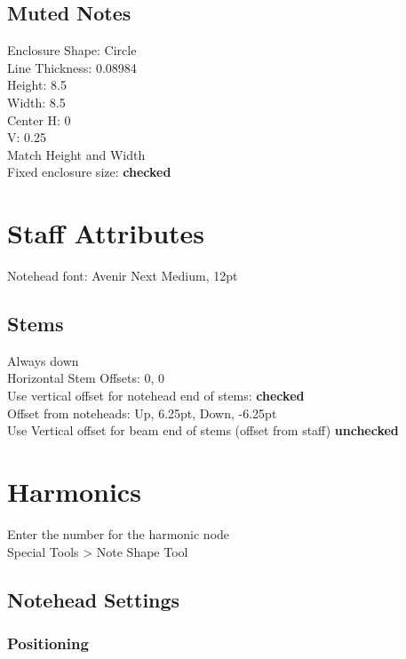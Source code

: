 \documentclass[10pt,twoside]{article} %
\begin{document}
\subsection{Muted Notes}
\label{sec:muted-notes}

Enclosure Shape: Circle\\
Line Thickness: 0.08984\\
Height: 8.5\\
Width: 8.5\\
Center H: 0\\
V: 0.25\\
Match Height and Width\\
Fixed enclosure size: \textbf{checked}

\section{Staff Attributes}
\label{sec:staff-attributes}

Notehead font: Avenir Next Medium, 12pt\\

\subsection{Stems}
\label{sec:stems}

Always down\\
Horizontal Stem Offsets: 0, 0\\
Use vertical offset for notehead end of stems: \textbf{checked}\\
Offset from noteheads: Up, 6.25pt, Down, -6.25pt\\
Use Vertical offset for beam end of stems (offset from staff) \textbf{unchecked}\\


\section{Harmonics}
\label{sec:harmonics}

Enter the number for the harmonic node\\
Special Tools > Note Shape Tool\\

\subsection{Notehead Settings}
\label{sec:notehead-settings}

\subsubsection{Positioning}
\label{sec:positioning}
\end{document}
